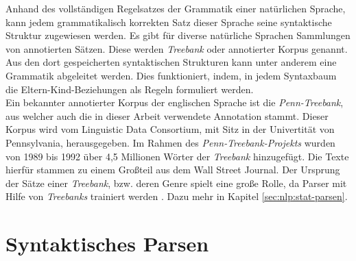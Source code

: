 Anhand des vollständigen Regelsatzes der Grammatik einer natürlichen Sprache, kann jedem grammatikalisch korrekten Satz dieser Sprache seine syntaktische Struktur zugewiesen werden. Es gibt für diverse natürliche Sprachen Sammlungen von annotierten Sätzen. Diese werden \textit{Treebank} oder annotierter Korpus genannt. Aus den dort gespeicherten syntaktischen Strukturen kann unter anderem eine Grammatik abgeleitet werden. Dies funktioniert, indem, in jedem Syntaxbaum die Eltern-Kind-Beziehungen als Regeln formuliert werden.\\
Ein bekannter annotierter Korpus der englischen Sprache ist die \textit{Penn-Treebank}, aus welcher auch die in dieser Arbeit verwendete Annotation stammt. Dieser Korpus wird vom Linguistic Data Consortium, mit Sitz in der Univertität von Pennsylvania, herausgegeben. \cite{ldc} 
Im Rahmen des \textit{Penn-Treebank-Projekts} wurden von 1989 bis 1992 über 4,5 Millionen Wörter der \textit{Treebank} hinzugefügt. Die Texte hierfür stammen zu einem Großteil aus dem Wall Street Journal. Der Ursprung der Sätze einer \textit{Treebank}, bzw. deren Genre spielt eine große Rolle, da Parser mit Hilfe von \textit{Treebanks} trainiert werden \cite{ptbInformationen}. Dazu mehr in Kapitel \ref{sec:nlp:stat-parsen}. 

\section{Syntaktisches Parsen}
\label{sec:nlp:syn-parsen}

